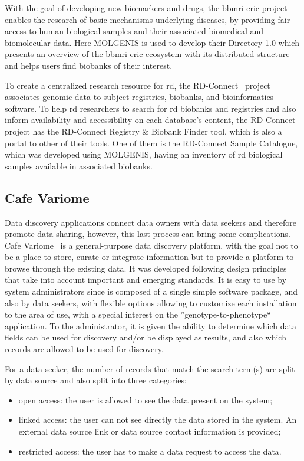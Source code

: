 With the goal of developing new biomarkers and drugs, the \gls{bbmri-eric} project~\cite{bbmrieric} enables the research of basic mechanisms underlying diseases, by providing \gls{fair} access to human biological samples and their associated biomedical and biomolecular data.
Here MOLGENIS is used to develop their Directory 1.0 which presents an overview of the \gls{bbmri-eric} ecosystem with its distributed structure and helps users find biobanks of their interest.

To create a centralized research resource for \gls{rd}, the RD-Connect~\cite{rdconnect} project associates genomic data to subject registries, biobanks, and bioinformatics software.
To help \gls{rd} researchers to search for \gls{rd} biobanks and registries and also inform availability and accessibility on each database's content, the RD-Connect project has the RD-Connect Registry \& Biobank Finder tool, which is also a portal to other of their tools. One of them is the RD-Connect Sample Catalogue, which was developed using MOLGENIS, having an inventory of \gls{rd} biological samples available in associated biobanks.

\subsection*{Cafe Variome}
Data discovery applications connect data owners with data seekers and therefore promote data sharing, however, this last process can bring some complications.
Cafe Variome~\cite{cafevariome} is a general-purpose data discovery platform, with the goal not to be a place to store, curate or integrate information but to provide a platform to browse through the existing data.
It was developed following design principles that take into account important and emerging standards.
It is easy to use by system administrators since is composed of a single simple software package, and also by data seekers, with flexible options allowing to customize each installation to the area of use, with a special interest on the  ''genotype-to-phenotype`` application.
To the administrator, it is given the ability to determine which data fields can be used for discovery and/or be displayed as results, and also which records are allowed to be used for discovery.

For a data seeker, the number of records that match the search term(s) are split by data source and also split into three categories:
\begin{itemize}
    \item open access: the user is allowed to see the data present on the system;
    \item linked access: the user can not see directly the data stored in the system.
        An external data source link or data source contact information is provided;
    \item restricted access: the user has to make a data request to access the data.
\end{itemize}

